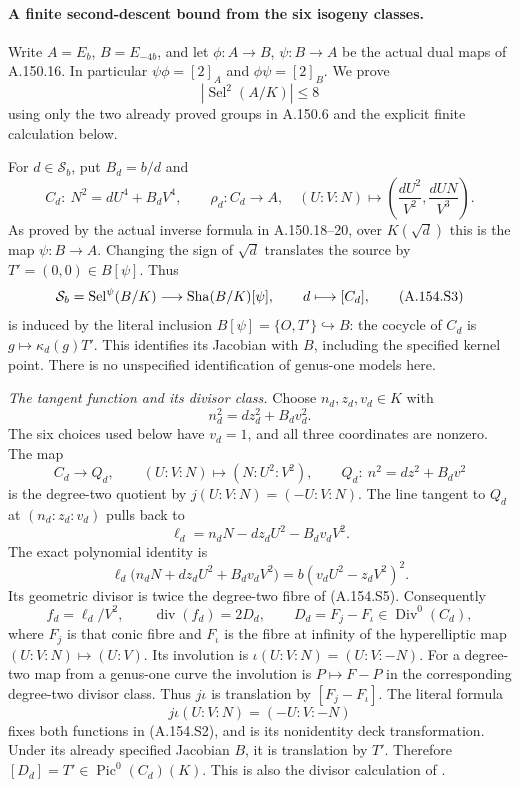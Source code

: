 \paragraph{A finite second-descent bound from the six isogeny classes.}
Write \(A=E_b\), \(B=E_{-4b}\), and let
\(\phi:A\to B\), \(\psi:B\to A\) be the actual dual maps
of A.150.16.  In particular \(\psi\phi=[2]_A\) and
\(\phi\psi=[2]_B\).  We prove
\[
                      |\operatorname{Sel}^{2}(A/K)|\leq8
\tag{A.154.S1}
\]
using only the two already proved groups in A.150.6
and the explicit finite calculation below.

For \(d\in\mathcal S_b\), put \(B_d=b/d\) and
\[
 C_d:\ N^2=dU^4+B_dV^4,\qquad
 \rho_d:C_d\longrightarrow A,\quad
 (U:V:N)\longmapsto
 \left(\frac{dU^2}{V^2},\frac{dUN}{V^3}\right).
\tag{A.154.S2}
\]
As proved by the actual inverse formula in A.150.18--20,
over \(K(\sqrt d)\) this is the map \(\psi:B\to A\).
Changing the sign of \(\sqrt d\) translates the source
by \(T'=(0,0)\in B[\psi]\).  Thus
\[
 \mathcal S_b=\operatorname{Sel}^{\psi}(B/K)
     \longrightarrow \operatorname{Sha}(B/K)[\psi],\qquad
 d\longmapsto [C_d],
\tag{A.154.S3}
\]
is induced by the literal inclusion
\(B[\psi]=\{O,T'\}\hookrightarrow B\):
the cocycle of \(C_d\) is \(g\mapsto\kappa_d(g)T'\).
This identifies its Jacobian with \(B\), including the
specified kernel point.  There is no unspecified
identification of genus-one models here.

\emph{The tangent function and its divisor class.}
Choose \(n_d,z_d,v_d\in K\) with
\[
                  n_d^2=dz_d^2+B_dv_d^2 .
\tag{A.154.S4}
\]
The six choices used below have \(v_d=1\), and all
three coordinates are nonzero.  The map
\[
 C_d\longrightarrow Q_d,\qquad
  (U:V:N)\longmapsto(N:U^2:V^2),\qquad
 Q_d:\ n^2=dz^2+B_dv^2
\tag{A.154.S5}
\]
is the degree-two quotient by
\(j(U:V:N)=(-U:V:N)\).
The line tangent to \(Q_d\) at \((n_d:z_d:v_d)\)
pulls back to
\[
 \ell_d=n_dN-dz_dU^2-B_dv_dV^2.
\]
The exact polynomial identity is
\[
 \ell_d\bigl(n_dN+dz_dU^2+B_dv_dV^2\bigr)
          =b(v_dU^2-z_dV^2)^2.
\tag{A.154.S6}
\]
Its geometric divisor is twice the degree-two fibre
of (A.154.S5).  Consequently
\[
 f_d=\ell_d/V^2,\qquad
       \operatorname{div}(f_d)=2D_d,\qquad
       D_d=F_j-F_\iota\in\operatorname{Div}^0(C_d),
\tag{A.154.S7}
\]
where \(F_j\) is that conic fibre and \(F_\iota\)
is the fibre at infinity of the hyperelliptic map
\((U:V:N)\mapsto(U:V)\).
Its involution is \(\iota(U:V:N)=(U:V:-N)\).
For a degree-two map from a genus-one curve the
involution is \(P\mapsto F-P\) in the corresponding
degree-two divisor class.  Thus \(j\iota\) is
translation by \([F_j-F_\iota]\).
The literal formula
\[
                    j\iota(U:V:N)=(-U:V:-N)
\]
fixes both functions in (A.154.S2), and is its
nonidentity deck transformation.  Under its already
specified Jacobian \(B\), it is translation by \(T'\).
Therefore \([D_d]=T'\in\operatorname{Pic}^0(C_d)(K)\).
This is also the divisor calculation of
\cite[Lemma 6.1]{AgentFisherBinaryQuartics2022}.

